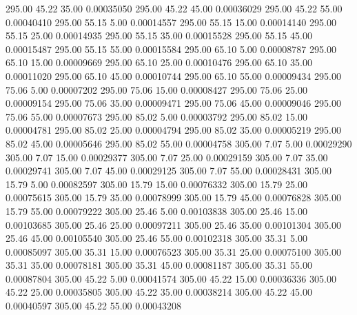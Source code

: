     295.00     45.22     35.00     0.00035050
    295.00     45.22     45.00     0.00036029
    295.00     45.22     55.00     0.00040410
    295.00     55.15      5.00     0.00014557
    295.00     55.15     15.00     0.00014140
    295.00     55.15     25.00     0.00014935
    295.00     55.15     35.00     0.00015528
    295.00     55.15     45.00     0.00015487
    295.00     55.15     55.00     0.00015584
    295.00     65.10      5.00     0.00008787
    295.00     65.10     15.00     0.00009669
    295.00     65.10     25.00     0.00010476
    295.00     65.10     35.00     0.00011020
    295.00     65.10     45.00     0.00010744
    295.00     65.10     55.00     0.00009434
    295.00     75.06      5.00     0.00007202
    295.00     75.06     15.00     0.00008427
    295.00     75.06     25.00     0.00009154
    295.00     75.06     35.00     0.00009471
    295.00     75.06     45.00     0.00009046
    295.00     75.06     55.00     0.00007673
    295.00     85.02      5.00     0.00003792
    295.00     85.02     15.00     0.00004781
    295.00     85.02     25.00     0.00004794
    295.00     85.02     35.00     0.00005219
    295.00     85.02     45.00     0.00005646
    295.00     85.02     55.00     0.00004758
    305.00      7.07      5.00     0.00029290
    305.00      7.07     15.00     0.00029377
    305.00      7.07     25.00     0.00029159
    305.00      7.07     35.00     0.00029741
    305.00      7.07     45.00     0.00029125
    305.00      7.07     55.00     0.00028431
    305.00     15.79      5.00     0.00082597
    305.00     15.79     15.00     0.00076332
    305.00     15.79     25.00     0.00075615
    305.00     15.79     35.00     0.00078999
    305.00     15.79     45.00     0.00076828
    305.00     15.79     55.00     0.00079222
    305.00     25.46      5.00     0.00103838
    305.00     25.46     15.00     0.00103685
    305.00     25.46     25.00     0.00097211
    305.00     25.46     35.00     0.00101304
    305.00     25.46     45.00     0.00105540
    305.00     25.46     55.00     0.00102318
    305.00     35.31      5.00     0.00085097
    305.00     35.31     15.00     0.00076523
    305.00     35.31     25.00     0.00075100
    305.00     35.31     35.00     0.00078181
    305.00     35.31     45.00     0.00081187
    305.00     35.31     55.00     0.00087804
    305.00     45.22      5.00     0.00041574
    305.00     45.22     15.00     0.00036336
    305.00     45.22     25.00     0.00035805
    305.00     45.22     35.00     0.00038214
    305.00     45.22     45.00     0.00040597
    305.00     45.22     55.00     0.00043208
